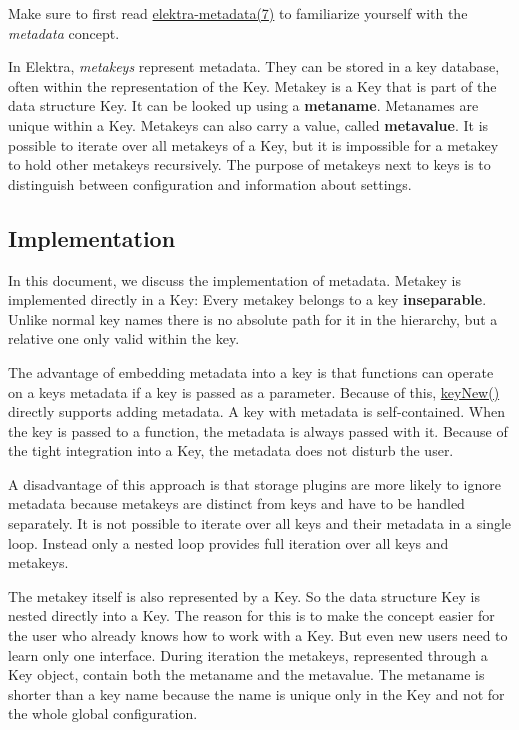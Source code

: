 Make sure to first read \hyperlink{doc_help_elektra-metadata_md}{elektra-\/metadata(7)} to familiarize yourself with the {\itshape metadata} concept.

In Elektra, {\itshape metakeys} represent metadata. They can be stored in a key database, often within the representation of the {\ttfamily Key}. Metakey is a {\ttfamily Key} that is part of the data structure {\ttfamily Key}. It can be looked up using a {\bfseries metaname}. Metanames are unique within a {\ttfamily Key}. Metakeys can also carry a value, called {\bfseries metavalue}. It is possible to iterate over all metakeys of a {\ttfamily Key}, but it is impossible for a metakey to hold other metakeys recursively. The purpose of metakeys next to keys is to distinguish between configuration and information about settings.

\subsection*{Implementation}

In this document, we discuss the implementation of metadata. Metakey is implemented directly in a {\ttfamily Key}\+: Every metakey belongs to a key {\bfseries inseparable}. Unlike normal key names there is no absolute path for it in the hierarchy, but a relative one only valid within the key.

The advantage of embedding metadata into a key is that functions can operate on a key\textquotesingle{}s metadata if a key is passed as a parameter. Because of this, {\ttfamily \hyperlink{group__key_gad23c65b44bf48d773759e1f9a4d43b89}{key\+New()}} directly supports adding metadata. A key with metadata is self-\/contained. When the key is passed to a function, the metadata is always passed with it. Because of the tight integration into a {\ttfamily Key}, the metadata does not disturb the user.

A disadvantage of this approach is that storage plugins are more likely to ignore metadata because metakeys are distinct from keys and have to be handled separately. It is not possible to iterate over all keys and their metadata in a single loop. Instead only a nested loop provides full iteration over all keys and metakeys.

The metakey itself is also represented by a {\ttfamily Key}. So the data structure {\ttfamily Key} is nested directly into a {\ttfamily Key}. The reason for this is to make the concept easier for the user who already knows how to work with a {\ttfamily Key}. But even new users need to learn only one interface. During iteration the metakeys, represented through a {\ttfamily Key} object, contain both the metaname and the metavalue. The metaname is shorter than a key name because the name is unique only in the {\ttfamily Key} and not for the whole global configuration.

